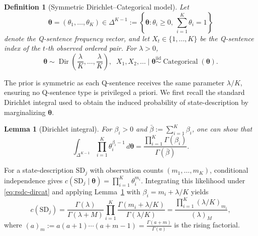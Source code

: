 \documentclass[10pt, conference, letterpaper]{ IEEEtran}
\theoremstyle{bfnote}
\newtheorem{lemma}{Lemma}
\newtheorem{definition}{Definition}
\begin{document}
\begin{definition}[Symmetric Dirichlet--Categorical model]
\label{def:rsdc-dircat}
Let
\[
\boldsymbol{\theta}=(\theta_1,\ldots,\theta_K)
\in
\Delta^{K-1}
:=
\left\{
\boldsymbol{\theta}:
\theta_i\geq0,\ 
\sum_{i=1}^{K}\theta_i=1
\right\}
\]
denote the Q-sentence frequency vector, and let
$X_t\in\{1,\ldots,K\}$ be the Q-sentence index of the $t$-th observed
ordered pair. For $\lambda>0$,
\begin{equation}
\label{eq:rsdc-dircat}
\boldsymbol{\theta}
\sim
\operatorname{Dir}\!\left(
\frac{\lambda}{K},\ldots,\frac{\lambda}{K}
\right),
\;\; X_1,X_2,\ldots\mid\boldsymbol{\theta}
\overset{\mathrm{iid}}{\sim}
\operatorname{Categorical}(\boldsymbol{\theta}).
\end{equation}
\end{definition}

The prior is symmetric as each Q-sentence receives the same parameter
$\lambda/K$, ensuring no Q-sentence type is privileged a priori. We first recall the standard Dirichlet integral
used to obtain the induced probability of state-description by marginalizing
$\boldsymbol{\theta}$.

\begin{lemma}[Dirichlet integral]
\label{lem:rsdc-beta}
For $\beta_i>0$ and
$\bar{\beta}:=\sum_{i=1}^{K}\beta_i$, one can show that
\begin{equation}
\label{eq:rsdc-betaint}
\int_{\Delta^{K-1}}
\prod_{i=1}^{K}\theta_i^{\beta_i-1}
\,d\boldsymbol{\theta}
=
\frac{\prod_{i=1}^{K}\Gamma(\beta_i)}
     {\Gamma(\bar{\beta})}.
\end{equation}
\end{lemma}

For a state-description $\mathrm{SD}_j$ with observation counts
$(m_1,\ldots,m_K)$, conditional independence gives
$
c(\mathrm{SD}_j\mid\boldsymbol{\theta})
=
\prod_{i=1}^{K}\theta_i^{m_i}.
$
Integrating this likelihood under \eqref{eq:rsdc-dircat} and applying
Lemma~\ref{lem:rsdc-beta} with
$\beta_i=m_i+\lambda/K$ yields
\begin{equation}
\label{eq:rsdc-mk}
c(\mathrm{SD}_j)
=
\frac{\Gamma(\lambda)}
     {\Gamma(\lambda+M)}
\prod_{i=1}^{K}
\frac{\Gamma(m_i+\lambda/K)}
     {\Gamma(\lambda/K)}
=
\frac{\prod_{i=1}^{K}(\lambda/K)_{m_i}}
     {(\lambda)_M},
\end{equation}
where
$
(a)_m
:=
a(a+1)\cdots(a+m-1)
=
\frac{\Gamma(a+m)}{\Gamma(a)}
$
is the rising factorial.
\end{document}
